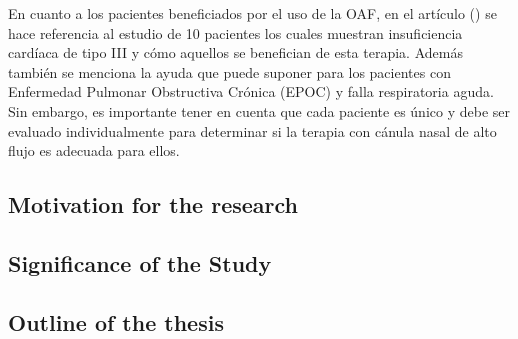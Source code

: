 En cuanto a los pacientes beneficiados por el uso de la OAF, en el artículo (\cite{Lodeserto2018}) se hace referencia al estudio de 10 pacientes los cuales muestran insuficiencia cardíaca de tipo III y cómo aquellos se benefician de esta terapia. Además también se menciona la ayuda que puede suponer para los pacientes con Enfermedad Pulmonar Obstructiva Crónica (EPOC) y falla respiratoria aguda. Sin embargo, es importante tener en cuenta que cada paciente es único y debe ser evaluado individualmente para determinar si la terapia con cánula nasal de alto flujo es adecuada para ellos.


\subsection{Motivation for the research}

\subsection{Significance of the Study}


\subsection{Outline of the thesis}


